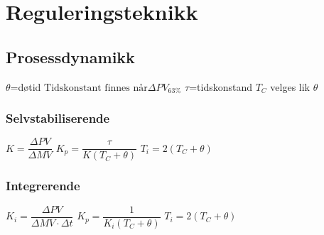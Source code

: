 \section{Reguleringsteknikk}
\vskip 2.5pt 
\subsection*{Prosessdynamikk}
\vskip 2.5pt 
$\theta$=døtid
\vskip 2.5pt 
$ \text{Tidskonstant finnes når} \Delta PV_{63\%}$
\vskip 2.5pt 
$\tau$=tidskonstand
\vskip 2.5pt 
$T_C$ velges lik $\theta$
\vskip 2.5pt 
\subsubsection*{Selvstabiliserende}
\vskip 2.5pt 
$K=\dfrac{\Delta PV}{\Delta MV} $
\vskip 2.5pt 
$K_p=\dfrac{\tau}{K(T_C+\theta)}$
\vskip 2.5pt 
$T_i=2(T_C+\theta)$
\vskip 2.5pt 
\subsubsection*{Integrerende}
\vskip 2.5pt 
$K_i=\dfrac{\Delta PV}{\Delta MV \cdot {\Delta t}}$
\vskip 2.5pt 
$K_p=\dfrac{1}{K_i(T_C+\theta)}$
\vskip 2.5pt 
$T_i=2(T_C+\theta)$\\
